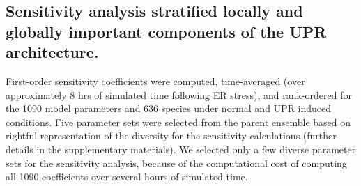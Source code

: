 \documentclass[fleqn,10pt]{wlscirep}
\begin{document}
\subsection*{Sensitivity analysis stratified locally and globally important components of the UPR architecture.} 
First-order sensitivity coefficients were computed, time-averaged (over approximately 8 hrs of simulated time following ER stress), and rank-ordered for the 1090 model parameters and 636 species under normal and UPR induced conditions. Five parameter sets were selected from the parent ensemble based on rightful representation of the diversity for the sensitivity calculations (further details in the supplementary materials). 
We selected only a few diverse parameter sets for the sensitivity analysis, because of the computational cost of computing all 1090 coefficients over several hours of simulated time. 
\end{document}
